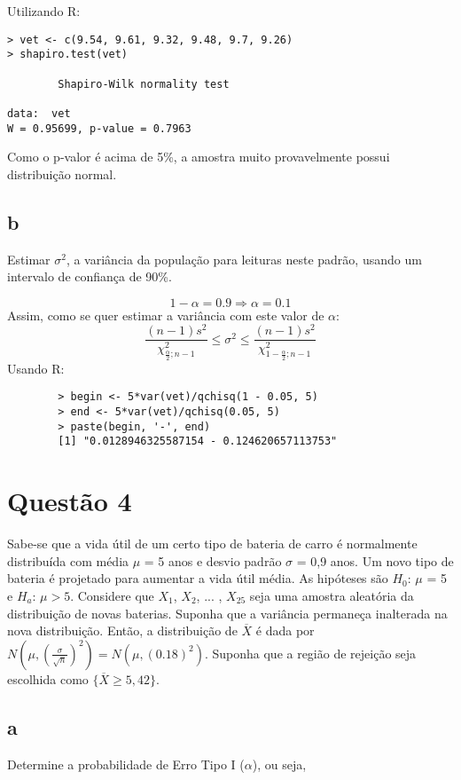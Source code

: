 \documentclass{article}[twocolumn]
\begin{document}
	Utilizando R:
	\begin{verbatim}
> vet <- c(9.54, 9.61, 9.32, 9.48, 9.7, 9.26)
> shapiro.test(vet)

        Shapiro-Wilk normality test

data:  vet
W = 0.95699, p-value = 0.7963
	\end{verbatim}
	Como o p-valor \'e acima de 5\%, a amostra muito provavelmente possui distribui\c{c}\~ao
	normal.
	\subsection{b}
	Estimar $\sigma^2$, a variância da população para leituras neste padrão, usando um intervalo
	de confiança de 90\%.
	
	\begin{equation}
		1 - \alpha = 0.9 \Rightarrow \alpha = 0.1
		\nonumber
	\end{equation}
	Assim, como se quer estimar a vari\^ancia com este valor de $\alpha$:
	\begin{equation}
		\frac{(n - 1)s^2}{\chi^2_{\frac{\alpha}{2}; n - 1}} \leq \sigma^2 \leq
		\frac{(n - 1)s^2}{\chi^2_{1 - \frac{\alpha}{2}; n - 1}}
		\nonumber
	\end{equation}
	Usando R:
	\begin{verbatim}
		> begin <- 5*var(vet)/qchisq(1 - 0.05, 5)
		> end <- 5*var(vet)/qchisq(0.05, 5)
		> paste(begin, '-', end)
		[1] "0.0128946325587154 - 0.124620657113753"
	\end{verbatim}
	\section{Quest\~ao 4}
	Sabe-se que a vida útil de um certo tipo de bateria de carro é normalmente distribuída
	com média $\mu$ = 5 anos e desvio padrão $\sigma$ = 0,9 anos. Um novo tipo de bateria
	é projetado para aumentar a vida útil média. As hipóteses são $H_0$: $\mu$ = 5 e $H_a$:
	$\mu > 5$. Considere que $X_1$, $X_2$, ... , $X_{25}$ seja uma amostra aleatória da
	distribuição de novas baterias. Suponha que a variância permaneça inalterada na nova
	distribuição. Então, a distribuição de $\overline{X}$ é dada por $N\left(\mu,\left(
	\frac{\sigma}{\sqrt{n}}\right)^2\right) = N(\mu, (0.18)^2)$. Suponha que a regi\~ao
	de rejei\c{c}\~ao seja escolhida como $\{\overline{X} \geq 5,42\}$.
	\subsection{a}
	Determine a probabilidade de Erro Tipo I ($\alpha$), ou seja,	
\end{document}
